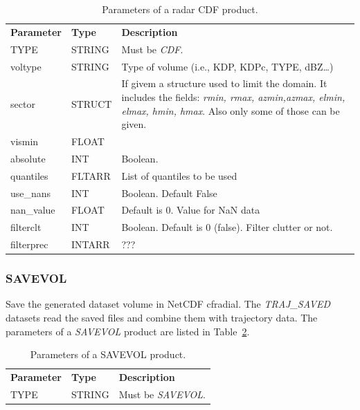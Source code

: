 \documentclass[a4paper,11pt,pdftex,twoside]{scrartcl}
\renewcommand{\bf}{\normalfont \bfseries}
\begin{document}
{{{\begin{table}[H]
 \begin{tabularx}{\textwidth}{llX}
 \bf{Parameter}  & \bf{Type}  & \bf{Description}\\
 TYPE           & STRING      & Must be \emph{CDF}.\\
 voltype        & STRING      & Type of volume (i.e., KDP, KDPc, TYPE, dBZ\dots)\\
 sector         & STRUCT      & If givem a structure used to limit the domain. It includes the fields:    \emph{rmin, rmax, azmin,azmax, elmin, elmax, hmin, hmax}. Also only some of those can be given. \\
 vismin        & FLOAT & \\
 absolute      & INT   & Boolean.  \\
 quantiles     & FLTARR & List of quantiles to be used \\
 use\_nans     & INT  & Boolean. Default False \\
 nan\_value    & FLOAT & Default is 0. Value for NaN data \\
 filterclt   & INT & Boolean. Default is 0 (false). Filter clutter or not. \\
 filterprec  & INTARR & ???\\
  \end{tabularx}
 \caption{Parameters of a radar CDF product.}
 \label{tab_product_cdf}
 \end{table}

 \subsubsection{SAVEVOL}
 \label{subsec_savevol}

Save the generated dataset volume in NetCDF cfradial. The \emph{TRAJ\_SAVED} datasets
 read the saved files and combine them with trajectory data.
The parameters of a \emph{SAVEVOL} product are listed in Table~\ref{tab_product_savevol}.

\begin{table}[H]
 \begin{tabularx}{\textwidth}{llX}
 \bf{Parameter}  & \bf{Type}  & \bf{Description}\\
 TYPE           & STRING     & Must be \emph{SAVEVOL}.\\
 \end{tabularx}
 \caption{Parameters of a SAVEVOL product.}
 \label{tab_product_savevol}
 \end{table}

}}}
\end{document}
